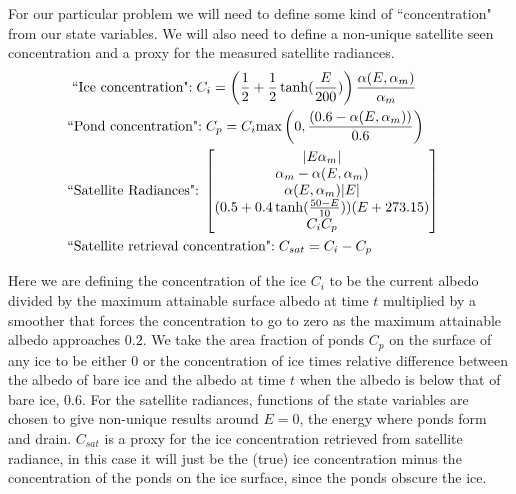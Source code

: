 \documentclass[10pt]{article}
\begin{document}
For our particular problem we will need to define some kind of ``concentration" from our state variables. We will also need to define a non-unique satellite seen concentration and a proxy for the measured satellite radiances.
\begin{align}
&\textrm{ ``Ice concentration":} \hspace{0.1cm}  C_i= \left( \frac{1}{2} + \frac{1}{2}\tanh(\frac{E}{200})\right) \frac{\alpha(E,\alpha_m)}{\alpha_m} & \\
&\textrm{``Pond concentration":} \hspace{0.1cm} C_p= C_i\text{max}\left(0,\frac{( 0.6- \alpha(E,\alpha_m))}{0.6} \right) &\\
&\textrm{``Satellite Radiances":} \hspace{0.1cm}
\begin{bmatrix}
|E\alpha_m|\\ 
\alpha_m-\alpha(E,\alpha_m) \\
\alpha(E,\alpha_m)|E|\\
(0.5+0.4\tanh(\frac{50-E}{10}))(E+273.15)\\
C_i C_p
\end{bmatrix}&\\
&\textrm{``Satellite retrieval concentration":}\hspace{0.1cm} C_{sat}=C_i-C_p &
\end{align}

Here we are defining the concentration of the ice $C_i$ to be the current albedo divided by the maximum attainable surface albedo at time $t$ multiplied by a smoother that forces the concentration to go to zero as the maximum attainable
albedo approaches $0.2$. We take the area fraction of ponds $C_p$ on the surface of any ice to be either $0$ or the concentration of ice times relative difference between the albedo of bare ice and the albedo at time $t$ when the albedo is below that of bare ice, $0.6$. For the satellite radiances, functions of the state variables are chosen to give non-unique results around $E=0$, the energy where ponds form and drain. $C_{sat}$ is a proxy for the ice concentration retrieved from satellite radiance, in this case it will just be the (true) ice concentration minus the concentration of the ponds on the ice surface, since the ponds obscure the ice.



\end{document}
